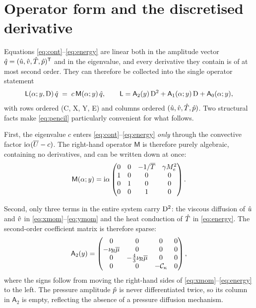 \documentclass[11pt]{article}
\begin{document}
\section{Operator form and the discretised derivative}\label{sec:operator}
Equations \eqref{eq:cont}--\eqref{eq:energy} are linear both in the amplitude vector
$\hat{q}=(\hat{u},\hat{v},\hat{T},\hat{p})^{\mathsf T}$ and in the eigenvalue, and every derivative they contain
is of at most second order. They can therefore be collected into the single operator statement
\begin{equation}\label{eq:pencil}
  \mathsf L(\alpha;y,\mathrm{D})\,\hat{q} \;=\; c\,\mathsf M(\alpha;y)\,\hat{q},
  \qquad
  \mathsf L=\mathsf A_2(y)\,\mathrm{D}^2+\mathsf A_1(\alpha;y)\,\mathrm{D}+\mathsf A_0(\alpha;y),
\end{equation}
with rows ordered (C, X, Y, E) and columns ordered $(\hat{u},\hat{v},\hat{T},\hat{p})$. Two structural facts
make \eqref{eq:pencil} particularly convenient for what follows.

First, the eigenvalue $c$ enters \eqref{eq:cont}--\eqref{eq:energy} \emph{only} through the convective
factor $\mathrm{i}\alpha(\overline{U}-c)$. The right-hand operator $\mathsf M$ is therefore purely algebraic,
containing no derivatives, and can be written down at once:
\begin{equation}\label{eq:Mmat}
  \mathsf M(\alpha;y)=\mathrm{i}\alpha
  \begin{pmatrix}
    0 & 0 & -1/\overline{T} & \gamma M_e^2\\
    1 & 0 & 0 & 0\\
    0 & 1 & 0 & 0\\
    0 & 0 & 1 & 0
  \end{pmatrix}.
\end{equation}

Second, only three terms in the entire system carry $\mathrm{D}^2$: the viscous diffusion of $\hat{u}$ and
$\hat{v}$ in \eqref{eq:xmom}--\eqref{eq:ymom} and the heat conduction of $\hat{T}$ in \eqref{eq:energy}.
The second-order coefficient matrix is therefore sparse:
\begin{equation}\label{eq:A2mat}
  \mathsf A_2(y)=
  \begin{pmatrix}
    0 & 0 & 0 & 0\\
    -\nu_{\!R}\overline{\mu} & 0 & 0 & 0\\
    0 & -\tfrac43\nu_{\!R}\overline{\mu} & 0 & 0\\
    0 & 0 & -\mathcal C_\kappa & 0
  \end{pmatrix},
\end{equation}
where the signs follow from moving the right-hand sides of \eqref{eq:xmom}--\eqref{eq:energy} to the
left. The pressure amplitude $\hat{p}$ is never differentiated twice, so its column in $\mathsf A_2$ is
empty, reflecting the absence of a pressure diffusion mechanism.
\end{document}
